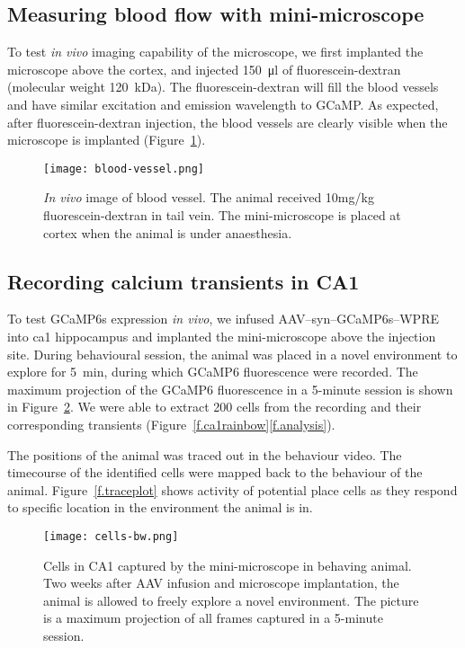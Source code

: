 \subsection{Measuring blood flow with mini-microscope}
To test \textit{in vivo} imaging capability of the microscope, we first implanted the microscope above the cortex, and injected \SI{150}{\ul} of fluorescein-dextran (molecular weight \SI{120}{\kilo\dalton}). The fluorescein-dextran will fill the blood vessels and have similar excitation and emission wavelength to GCaMP. As expected, after fluorescein-dextran injection, the blood vessels are clearly visible when the microscope is implanted (Figure~\ref{f.bloodvessel}).
\begin{figure}[h]
    \texttt{[image: blood-vessel.png]}
    \caption{\textit{In vivo} image of blood vessel. The animal received 10mg/kg fluorescein-dextran in tail vein. The mini-microscope is placed at cortex when the animal is under anaesthesia. \label{f.bloodvessel}}
\end{figure}


\subsection{Recording calcium transients in CA1}
To test GCaMP6s expression \textit{in vivo}, we infused AAV--syn--GCaMP6s--WPRE into \gls{ca1} hippocampus and implanted the mini-microscope above the injection site. During behavioural session, the animal was placed in a novel environment to explore for \SI{5}{\minute}, during which GCaMP6 fluorescence were recorded. The maximum projection of the GCaMP6 fluorescence in a 5-minute session is shown in Figure~\ref{f.ca1bw}. We were able to extract 200 cells from the recording and their corresponding  transients (Figure~\ref{f.ca1rainbow}\ref{f.analysis}).

The positions of the animal was traced out in the behaviour video. The timecourse of the identified cells were mapped back to the behaviour of the animal. Figure~\ref{f.traceplot} shows  activity of potential place cells as they respond to specific location in the environment the animal is in.
\begin{figure}[h]
    \texttt{[image: cells-bw.png]}
    \caption{Cells in CA1 captured by the mini-microscope in behaving animal. Two weeks after AAV infusion and microscope implantation, the animal is allowed to freely explore a novel environment. The picture is a maximum projection of all frames captured in a 5-minute session. \label{f.ca1bw}}
\end{figure}

